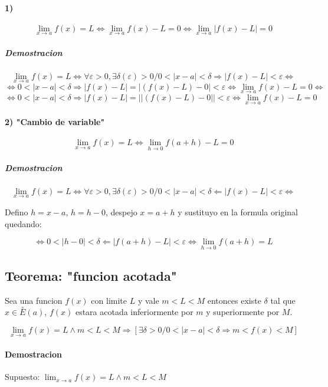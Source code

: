 \paragraph{1)}
$$\lim_{x \to a}{f(x)}=L \Leftrightarrow \lim_{x \to a}{f(x)-L}=0 \Leftrightarrow \lim_{x \to a}{|f(x)-L|}=0$$
 
\subparagraph{Demostracion \\}

$$\lim_{x \to a}{f(x)} =L\Leftrightarrow \forall \varepsilon >0, \exists \delta (\varepsilon)>0/ 0<|x-a|<\delta \Rightarrow |f(x)-L|<\varepsilon \Leftrightarrow$$
$$\Leftrightarrow 0<|x-a|<\delta \Rightarrow |f(x)-L|=|(f(x)-L)-0| <\varepsilon \Leftrightarrow \lim_{x \to a}{f(x)-L}=0 \Leftrightarrow$$
$$\Leftrightarrow 0<|x-a|<\delta \Rightarrow |f(x)-L|=||(f(x)-L)-0|| <\varepsilon \Leftrightarrow \lim_{x \to a}{f(x)-L} = 0 $$

\paragraph{2) "Cambio de variable"}

$$\lim_{x \to a}{f(x)}=L \Leftrightarrow \lim_{h \to 0}{f(a+h)-L}=0 $$

\subparagraph{Demostracion \\ }

$$ \lim_{x \to a}{f(x)}=L \Leftrightarrow \forall \varepsilon >0, \exists \delta(\varepsilon)>0 / 0<|x-a|<\delta \Leftarrow |f(x)-L|< \varepsilon \Leftrightarrow$$
\begin{center}
  Defino $h=x-a$, $h=h-0$, despejo $x=a+h$ y sustituyo en la formula original quedando:
\end{center}
$$\Leftrightarrow 0<|h-0|<\delta \Leftarrow |f(a+h)-L| < \varepsilon \Leftrightarrow \lim_{h \to 0 }{f(a+h)}=L$$

\subsection{Teorema: "funcion acotada"}

Sea una funcion $f(x)$ con limite $L$ y vale $m<L<M$ entonces existe $\delta$ tal que $x\in \stackrel{\circ}{E}(a)$, $f(x)$ estara acotada inferiormente por $m$ y superiormente por $M$.

$$\lim_{x \to a}{f(x)}=L \wedge m<L<M \Rightarrow [\exists \delta >0/0<|x-a|<\delta \Rightarrow m<f(x)<M]$$

\paragraph{Demostracion \\}

Supuesto: $\lim_{x \to a}{f(x)}=L \wedge m<L<M$

